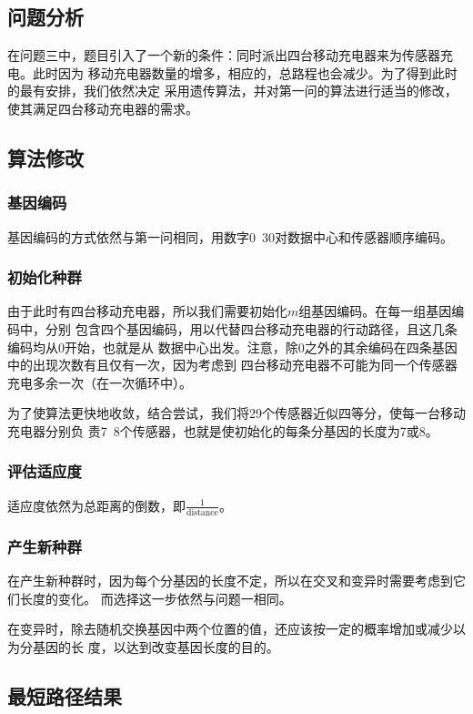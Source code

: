 \documentclass{ctexart}
\begin{document}
    \subsection{问题分析}
    在问题三中，题目引入了一个新的条件：同时派出四台移动充电器来为传感器充电。此时因为
    移动充电器数量的增多，相应的，总路程也会减少。为了得到此时的最有安排，我们依然决定
    采用遗传算法，并对第一问的算法进行适当的修改，使其满足四台移动充电器的需求。
    \subsection{算法修改}
    \subsubsection{基因编码}
    基因编码的方式依然与第一问相同，用数字0~30对数据中心和传感器顺序编码。
    \subsubsection{初始化种群}
    由于此时有四台移动充电器，所以我们需要初始化$m$组基因编码。在每一组基因编码中，分别
    包含四个基因编码，用以代替四台移动充电器的行动路径，且这几条编码均从0开始，也就是从
    数据中心出发。注意，除0之外的其余编码在四条基因中的出现次数有且仅有一次，因为考虑到
    四台移动充电器不可能为同一个传感器充电多余一次（在一次循环中）。

    为了使算法更快地收敛，结合尝试，我们将29个传感器近似四等分，使每一台移动充电器分别负
    责7~8个传感器，也就是使初始化的每条分基因的长度为7或8。
    \subsubsection{评估适应度}
    适应度依然为总距离的倒数，即$\frac{1}{\mbox{distance}}$。
    \subsubsection{产生新种群}
    在产生新种群时，因为每个分基因的长度不定，所以在交叉和变异时需要考虑到它们长度的变化。
    而选择这一步依然与问题一相同。

    在变异时，除去随机交换基因中两个位置的值，还应该按一定的概率增加或减少以为分基因的长
    度，以达到改变基因长度的目的。

    \subsection{最短路径结果}
\end{document}
